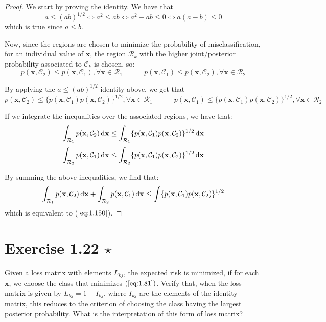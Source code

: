 \begin{proof}
    We start by proving the identity. We have that 
    \[
        a \leq (ab)^{1/2} \iff a^2 \leq ab \iff a^2 - ab \leq 0 \iff a(a - b) \leq 0
    \] 
    which is true since $a \leq b$.

    Now, since the regions are chosen to minimize the probability of misclassification,
    for an individual value of $\mathbf{x}$, the region $\mathcal{R}_k$ with the higher joint/posterior 
    probability associated to $\mathcal{C}_k$ is chosen, so:
    \[
        p(\mathbf{x}, \mathcal{C}_2) \leq p(\mathbf{x}, \mathcal{C}_1), \forall \mathbf{x} \in \mathcal{R}_1
        \hspace{3em}
        p(\mathbf{x}, \mathcal{C}_1) \leq p(\mathbf{x}, \mathcal{C}_2), \forall \mathbf{x} \in \mathcal{R}_2
    \] 

    By applying the $a \leq (ab)^{1/2}$ identity above, we get that
    \[
        p(\mathbf{x}, \mathcal{C}_2) \leq \{p(\mathbf{x}, \mathcal{C}_1) p(\mathbf{x}, \mathcal{C}_2)\}^{1/2},
        \forall \mathbf{x} \in \mathcal{R}_1
        \hspace{3em}
        p(\mathbf{x}, \mathcal{C}_1) \leq \{p(\mathbf{x}, \mathcal{C}_1) p(\mathbf{x}, \mathcal{C}_2)\}^{1/2},
        \forall \mathbf{x} \in \mathcal{R}_2
    \] 

    If we integrate the inequalities over the associated regions, we have that:
    \[
        \int_{\mathcal{R}_1} p(\mathbf{x}, \mathcal{C}_2) \mathop{}\!\mathrm{d} \mathbf{x} \leq 
        \int_{\mathcal{R}_1} \{p(\mathbf{x}, \mathcal{C}_1) p(\mathbf{x}, \mathcal{C}_2)\}^{1/2} \mathop{}\!\mathrm{d} \mathbf{x}
    \] 
    \[
        \int_{\mathcal{R}_2} p(\mathbf{x}, \mathcal{C}_1) \mathop{}\!\mathrm{d} \mathbf{x} \leq 
        \int_{\mathcal{R}_2} \{p(\mathbf{x}, \mathcal{C}_1) p(\mathbf{x}, \mathcal{C}_2)\}^{1/2} \mathop{}\!\mathrm{d} \mathbf{x}
    \]

    By summing the above inequalities, we find that:
    \[
        \int_{\mathcal{R}_1} p(\mathbf{x}, \mathcal{C}_2) \mathop{}\!\mathrm{d} \mathbf{x} + 
        \int_{\mathcal{R}_2} p(\mathbf{x}, \mathcal{C}_1) \mathop{}\!\mathrm{d} \mathbf{x} \leq
        \int \{p(\mathbf{x}, \mathcal{C}_1)p(\mathbf{x}, \mathcal{C}_2)\}^{1/2} 
    \] 
    which is equivalent to ($\ref{eq:1.150}$).
\end{proof}

\section*{Exercise 1.22 $\star$}
Given a loss matrix with elements $L_{kj}$, the expected risk
is minimized, if for each $\mathbf{x}$, we choose the class that minimizes
$(\ref{eq:1.81})$. Verify that, when the loss matrix is given by $L_{kj} = 1 - I_{kj}$,
where $I_{kj}$ are the elements of the identity matrix, this reduces to the criterion
of choosing the class having the largest posterior probability. What is the interpretation
of this form of loss matrix?

